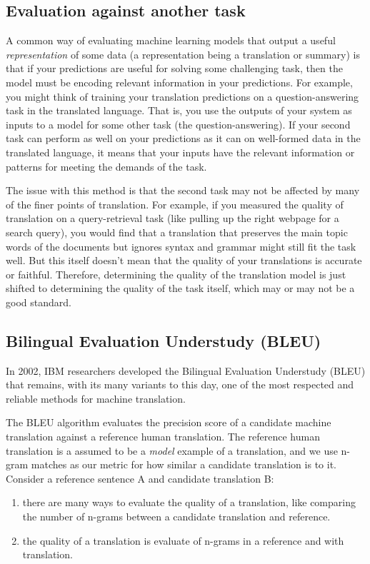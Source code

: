 \documentclass{tufte-handout}
\begin{document}
\subsection{Evaluation against another task}
A common way of evaluating machine learning models that output a useful \textit{representation} of some data (a representation being a translation or summary) is that if your predictions are useful for solving some challenging task, then the model must be encoding relevant information in your predictions. 
For example, you might think of training your translation predictions on a question-answering task in the translated language. That is, you use the outputs of your system as inputs to a model for some other task (the question-answering). If your second task can perform as well on your predictions as it can on well-formed data in the translated language, it means that your inputs have the relevant information or patterns for meeting the demands of the task.

The issue with this method is that the second task may not be affected by many of the finer points of translation. For example, if you measured the quality of translation on a query-retrieval task (like pulling up the right webpage for a search query), you would find that a translation that preserves the main topic words of the documents but ignores syntax and grammar might still fit the task well. But this itself doesn't mean that the quality of your translations is accurate or faithful. Therefore, determining the quality of the translation model is just shifted to determining the quality of the task itself, which may or may not be a good standard.

\subsection{Bilingual Evaluation Understudy (BLEU)}
In 2002, IBM researchers developed the Bilingual Evaluation Understudy (BLEU) that remains, with its many variants to this day, one of the most respected and reliable methods for machine translation.

The BLEU algorithm evaluates the precision score of a candidate machine translation against a reference human translation. The reference human translation is a assumed to be a \textit{model} example of a translation, and we use n-gram matches as our metric for how similar a candidate translation is to it. Consider a reference sentence A and candidate translation B:

\begin{enumerate}[A]
\item there are many ways to evaluate the quality of a translation, like comparing the number of n-grams between a candidate translation and reference.
\item the quality of a translation is evaluate of n-grams in a reference and with translation. 
\end{enumerate}
\end{document}
